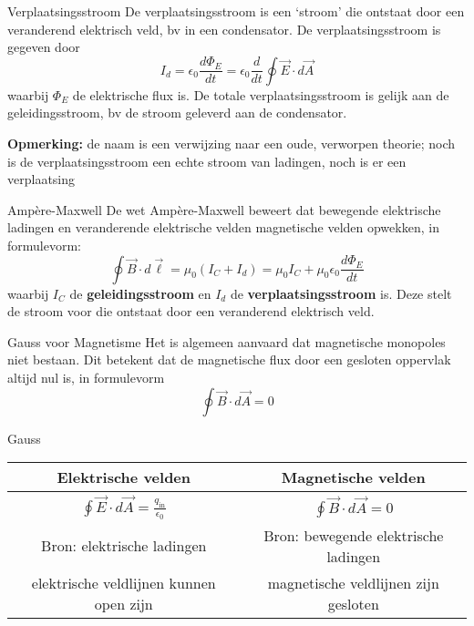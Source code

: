 \begin{theo}[Verplaatsingsstroom]{Verplaatsingsstroom}
    De verplaatsingsstroom is een `stroom' die ontstaat door een veranderend elektrisch veld, bv in een condensator. De verplaatsingsstroom is gegeven door
    \begin{equation*}
        I_d = \epsilon_0 \frac{d\Phi_E}{dt} = \epsilon_0 \frac{d}{dt} \oint \Vec{E} \cdot d\Vec{A}
    \end{equation*}
    waarbij $ \Phi_E $ de elektrische flux is.
    De totale verplaatsingsstroom is gelijk aan de geleidingsstroom, bv de stroom geleverd aan de condensator.

    \vspace{0.3cm}
    \noindent \textbf{Opmerking:} de naam is een verwijzing naar een oude, verworpen theorie; noch is de verplaatsingsstroom een echte stroom van ladingen, noch is er een verplaatsing
\end{theo}

\begin{lem}{Ampère-Maxwell}
    De wet Ampère-Maxwell beweert dat bewegende elektrische ladingen en veranderende elektrische velden magnetische velden opwekken, in formulevorm:
    \begin{equation*}
        \oint \Vec{B} \cdot d\Vec{\ell}
        = \mu_0 ( I_C + I_d ) 
        = \mu_0 I_C + \mu_0 \epsilon_0 \frac{d\Phi_E}{dt} 
    \end{equation*}
    waarbij $ I_C $ de \textbf{geleidingsstroom} en $ I_d $ de \textbf{verplaatsingsstroom} is. Deze stelt de stroom voor die ontstaat door een veranderend elektrisch veld. 
\end{lem}

\begin{lem}{Gauss voor Magnetisme}
    Het is algemeen aanvaard dat magnetische monopoles niet bestaan. Dit betekent dat de magnetische flux door een gesloten oppervlak altijd nul is, in formulevorm
    \begin{equation*}
        \oint \Vec{B} \cdot d\Vec{A} = 0
    \end{equation*}
    \vspace{-0.5cm}
\end{lem}

\begin{vrg}[Gauss]{Gauss}
    \vspace{-0.3cm}
    \def\arraystretch{2}
    \hspace{1.5cm}
    \begin{tabular}{c|c}
        Elektrische velden & Magnetische velden \\ \hline
        $\oint \Vec{E} \cdot d\Vec{A} = \frac{q_{\text{in}}}{\epsilon_0}$ &  $\oint \Vec{B} \cdot d\Vec{A} = 0$ \\
        Bron: elektrische ladingen & Bron: bewegende elektrische ladingen \\
        elektrische veldlijnen kunnen open zijn & magnetische veldlijnen zijn gesloten \\
    \end{tabular}
\end{vrg}
